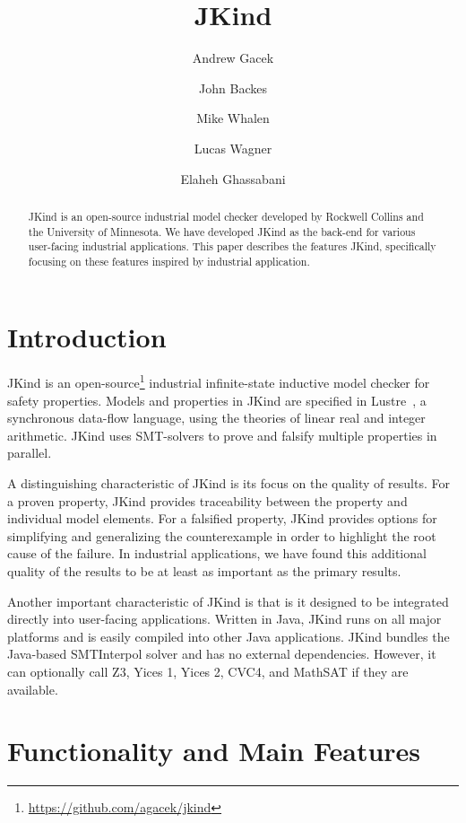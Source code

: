 \documentclass{llncs}
\title{JKind}
\author{
  Andrew Gacek\inst{1} \and
  John Backes\inst{1} \and
  Mike Whalen\inst{2} \and
  Lucas Wagner\inst{1} \and
  Elaheh Ghassabani\inst{2}}
\institute{
  Rockwell Collins \\
  \and
  University of Minnesota
}
\newcommand{\jkind}{{\sc JKind}\xspace}
\newcommand{\lustre}{{\sc Lustre}\xspace}
\begin{document}
\maketitle

\begin{abstract}
  \jkind is an open-source industrial model checker developed by
  Rockwell Collins and the University of Minnesota. We have developed
  \jkind as the back-end for various user-facing industrial
  applications. This paper describes the features \jkind, specifically
  focusing on these features inspired by industrial application.
\end{abstract}

\section{Introduction}

\jkind is an
open-source\footnote{\url{https://github.com/agacek/jkind}} industrial
infinite-state inductive model checker for safety properties. Models
and properties in \jkind are specified in
\lustre~\cite{halbwachs1991ieee}, a synchronous data-flow language,
using the theories of linear real and integer arithmetic. \jkind uses
SMT-solvers to prove and falsify multiple properties in parallel.

A distinguishing characteristic of \jkind is its focus on the quality
of results. For a proven property, \jkind provides traceability
between the property and individual model elements. For a falsified
property, \jkind provides options for simplifying and generalizing the
counterexample in order to highlight the root cause of the failure. In
industrial applications, we have found this additional quality of the
results to be at least as important as the primary results.

Another important characteristic of \jkind is that is it designed to
be integrated directly into user-facing applications. Written in Java,
\jkind runs on all major platforms and is easily compiled into other
Java applications. \jkind bundles the Java-based {\sc SMTInterpol}
solver and has no external dependencies. However, it can optionally
call {\sc Z3}, {\sc Yices 1}, {\sc Yices 2}, {\sc CVC4}, and {\sc
  MathSAT} if they are available.

\section{Functionality and Main Features}
\end{document}
